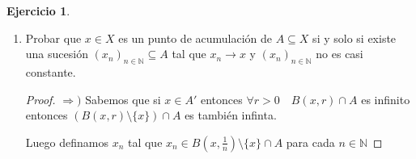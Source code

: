 \documentclass[12pt]{report}
\newcommand{\N}{\mathbb{N}}
\newcommand{\Ra}{\Rightarrow}
\newcommand{\ra}{\rightarrow}
\newcommand{\ol}{\overline}
\theoremstyle{definition}
\newtheorem*{remark}{Observación}
\newtheorem{ej}{Ejercicio}
\begin{document}
\begin{ej}
\begin{enumerate}
\begin{enumerate}
\begin{proof}
      Pero entonces existe $r>0$ tal que $B(x,r) \cap A = \{x\}$, si fuese otro eleménto $y$ el único , usaríamos $r'= \frac{d(x,y)}{2}$ y entonces $y \notin B(x,r')$

      Entonces $x \in A$

      Entonces siempre que $x \in \ol A \Ra x \in A$ o $x \in A'$ por lo tanto $x \in A \cup A' $ 
	  \end{proof}
	\item $(\ol A)' = A'$
	  \begin{proof}
	$\supseteq )$ Usando el b) tenemos que como $A \subseteq \ol A \Ra A' \subseteq (\ol A)'$

      $\subseteq )$ Sea $x \in (\ol A)'$ entonces existe $(x_n)_{n\in \N} \subseteq \ol A \setminus \{x\}= (A \cup A') \setminus \{x\}$ tal que $x_n \ra x$

    Luego $x_{n}$ tiene infinitos términos en $A$ o en $A'$ o en las dos

  Si tiene infinitos en $A$ podemos armar una subsucesión $(x_{n_{j}})_{n\in \N} \subseteq A$ como es subsucesión $x_{n_j} \ra x$ entonces $x \in A'$

Si tiene infinitos en $A'$ similarmente llegamos a que $x \in (A')' \subseteq A'$

Si tiene infinitos en las dos , podemos usar cualquiera de los dos argumentos

\begin{remark}
 $(A')'\subseteq A'$ 
 \begin{proof}
 $A'$ es cerrado por lo tanto para cualquier $(x_{n})_n \subseteq A'$ tal que $x_n \ra x$ sucede que $x \in A'$. Si no , no sería cerrado 

Luego $A'$ contiene a todos sus puntos de acumulación por lo tanto $(A')' \subseteq A'$
 \end{proof} 
\end{remark}
	  \end{proof}
      \end{enumerate}
      \newpage
    \item Probar que $x \in X$ es un punto de acumulación de $A \subseteq X$ si y solo si existe una sucesión $(x_{n})_{n \in \N} \subseteq A$ tal que $x_{n} \ra x$ y $(x_{n})_{n \in \N}$ no es casi constante. 
      \begin{proof}
    $\Ra )$ Sabemos que si $x \in A'$ entonces $\forall r>0 \quad B(x,r) \cap A$ es infinito entonces $(B(x,r)\setminus \{x\}) \cap A$ es también infinta. 

      Luego definamos $x_{n}$ tal que $x_{n} \in B(x,\frac{1}{n}) \setminus \{x\} \cap A$ para cada $n \in \N$


\end{proof}
\end{enumerate}
\end{ej}
\end{document}
